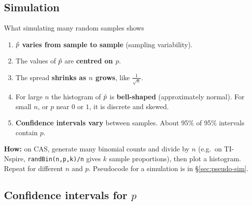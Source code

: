 \subsection{Simulation}
\label{sec:sim}

\begin{keyres}{What simulating many random samples shows}
\begin{cols}
\begin{enumerate}
  \item $\hat{p}$ \textbf{varies from sample to sample} (sampling variability).
  \item The values of $\hat{p}$ are \textbf{centred on $p$}.
  \item The spread \textbf{shrinks as $n$ grows}, like $\frac{1}{\sqrt n}$.
\end{enumerate}
\nextcol
\begin{enumerate}\setcounter{enumi}{3}
  \item For large $n$ the histogram of $\hat{p}$ is \textbf{bell-shaped} (approximately normal). For small $n$, or $p$ near $0$ or $1$, it is discrete and skewed.
  \item \textbf{Confidence intervals vary} between samples. About 95\% of 95\% intervals contain $p$.
\end{enumerate}
\end{cols}
\textbf{How:} on CAS, generate many binomial counts and divide by $n$ (e.g.\ on TI-Nspire, \texttt{randBin(n,p,k)/n} gives $k$ sample proportions), then plot a histogram. Repeat for different $n$ and $p$. Pseudocode for a simulation is in \S\ref{sec:pseudo-sim}.
\end{keyres}

\subsection{Confidence intervals for $p$}
\label{sec:ci}

